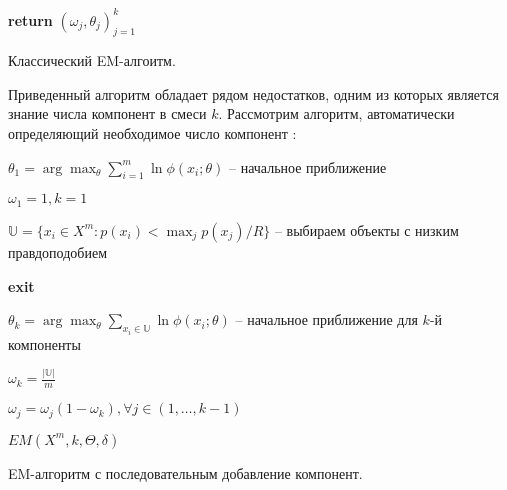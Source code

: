 \documentclass[12pt,a4paper]{report}
\begin{document}
\begin{algorithm}[H]
\SetAlgoLined
{}

\textbf{return} $(\omega_j, \theta_j)_{j=1}^k$
\caption{Классический EM-алгоитм.}
\label{alg:EM}
\end{algorithm}

Приведенный алгоритм обладает рядом недостатков, одним из которых является знание числа компонент в смеси  $k$. Рассмотрим алгоритм, автоматически определяющий необходимое число компонент \cite{Kem}:

\begin{algorithm}[H]
\SetAlgoLined
{}

$\theta_1 =  \arg \max_{\theta} \sum_{i=1}^{m} \ln\phi(x_i; \theta)$ -- начальное приближение

$\omega_1 = 1, k = 1$

 {
	$\mathbb{U} = \{x_i \in X^m: p(x_i) < \max_j p(x_j) / R\}$ -- выбираем объекты с низким правдоподобием
	
	 {
		\textbf{exit}
	}
	
	$\theta_k =  \arg \max_{\theta} \sum_{x_i \in \mathbb{U}} \ln\phi(x_i; \theta)$ -- начальное приближение для $k$-й компоненты
	
	$\omega_k = \frac{|\mathbb{U}|}{m}$
	
	$\omega_j = \omega_j(1-\omega_k), \forall j \in (1, \dots, k-1)$
	
	$EM(X^m, k, \Theta, \delta)$
}
\caption{EM-алгоритм с последовательным добавление компонент.}
\label{alg:KEM}
\end{algorithm}
\end{document}
